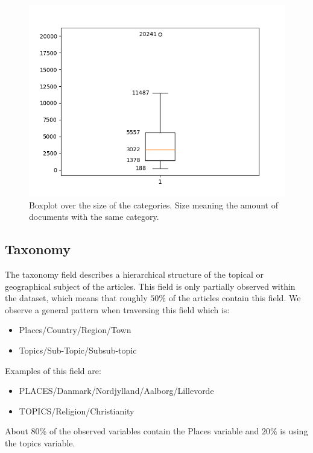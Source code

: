 \begin{figure}
	\centering
	\includegraphics[width=1 \linewidth]{figures/category_box.png}
	\caption{Boxplot over the size of the categories. Size meaning the amount of documents with the same category.}
	\label{fig:category_box}
\end{figure}

\subsection{Taxonomy}
The taxonomy field describes a hierarchical structure of the topical or geographical subject of the articles.
This field is only partially observed within the dataset, which means that roughly $50\%$ of the articles contain this field.
We observe a general pattern when traversing this field which is:
\begin{itemize}
	\item Places/Country/Region/Town
	\item Topics/Sub-Topic/Subsub-topic
\end{itemize}
Examples of this field are:
\begin{itemize}
	\item PLACES/Danmark/Nordjylland/Aalborg/Lillevorde
	\item TOPICS/Religion/Christianity
\end{itemize}
About $80\%$ of the observed variables contain the Places variable and $20\%$ is using the topics variable. 


